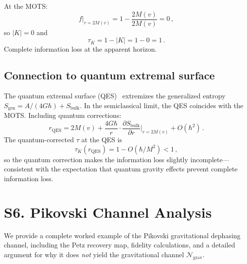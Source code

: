 \documentclass[aps,prd,preprint,superscriptaddress,longbibliography]{revtex4-2}
\newcommand{\chan}{\mathcal{N}}
\newcommand{\tauasym}{\tau}
\begin{document}
At the MOTS:
\begin{equation}
  f\big|_{r=2M(v)} = 1 - \frac{2M(v)}{2M(v)} = 0\,,
  \label{eq:f_MOTS}
\end{equation}
so $|K| = 0$ and
\begin{equation}
  \tauasym_K = 1 - |K| = 1 - 0 = 1\,.
  \label{eq:tau_MOTS}
\end{equation}
Complete information loss at the apparent horizon.

\subsection{Connection to quantum extremal surface}

The quantum extremal surface (QES)~\cite{Engelhardt2015} extremizes
the generalized entropy $S_{\mathrm{gen}} = A/(4G\hbar) + S_{\mathrm{bulk}}$.
In the semiclassical limit, the QES coincides with the MOTS.
Including quantum corrections:
\begin{equation}
  r_{\mathrm{QES}} = 2M(v) + \frac{4G\hbar}{r}\cdot
  \frac{\partial S_{\mathrm{bulk}}}{\partial r}\bigg|_{r=2M(v)}
  + O(\hbar^2)\,.
  \label{eq:QES_correction}
\end{equation}
The quantum-corrected $\tauasym$ at the QES is
\begin{equation}
  \tauasym_K(r_{\mathrm{QES}}) = 1 - O(\hbar/M^2) < 1\,,
  \label{eq:tau_QES}
\end{equation}
so the quantum correction makes the information loss slightly
incomplete---consistent with the expectation that quantum gravity
effects prevent complete information loss.

\section{S6. Pikovski Channel Analysis}
\label{sec:pikovski}

We provide a complete worked example of the Pikovski gravitational
dephasing channel, including the Petz recovery map, fidelity
calculations, and a detailed argument for why it does \emph{not}
yield the gravitational channel $\chan_{\mathrm{grav}}$.

\end{document}
